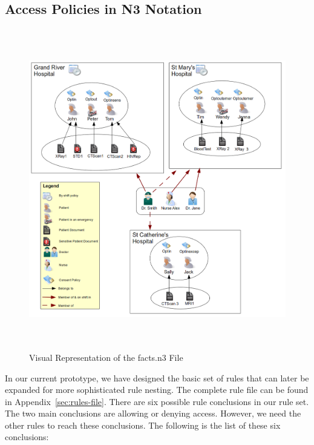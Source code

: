 \documentclass[conference]{IEEEtran}
\begin{document}
\subsection{Access Policies in N3 Notation}
\label{rules-sec}

\begin{figure}[t]
\centering
\includegraphics[width=16cm,height=14cm]{BigPicture.png}
\caption{Visual Representation of the facts.n3 File}
\label{fig:allfacts}
\end{figure}

In our current prototype, we have designed the basic set of rules that can later be expanded for more sophisticated rule nesting. The complete rule file can be
found in Appendix~\ref{sec:rules-file}. There are six possible rule conclusions in our rule set. The two main conclusions are allowing or denying
access. However, we need the other rules to reach these conclusions. The following is the list of these six conclusions:
\end{document}
